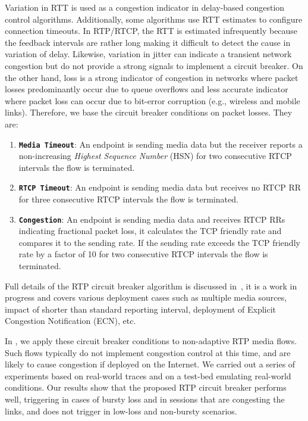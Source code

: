 Variation in RTT is used as a congestion indicator in delay-based congestion
control algorithms. Additionally, some algorithms use RTT estimates to
configure connection timeouts. In RTP/RTCP, the RTT is estimated infrequently
because the feedback intervals are rather long making it difficult to detect
the cause in variation of delay. Likewise, variation in jitter can indicate a
transient network congestion but do not provide a strong signals to implement
a circuit breaker. On the other hand, loss is a strong indicator of congestion
in networks where packet losses predominantly occur due to queue overflows and
less accurate indicator where packet loss can occur due to bit-error
corruption (e.g., wireless and mobile links). Therefore, we base the circuit
breaker conditions on packet losses. They are:

\begin{enumerate}
\setlength{\itemsep}{0pt}

\item \textbf{\texttt{Media Timeout}}: An endpoint is sending media data but
the receiver reports a non-increasing \emph{Highest Sequence Number} (HSN) for
two consecutive RTCP intervals the flow is terminated.

\item \textbf{\texttt{RTCP Timeout}}: An endpoint is sending media data but
receives no RTCP RR for three consecutive RTCP intervals the flow is
terminated.

\item \textbf{\texttt{Congestion}}: An endpoint is sending media data and
receives RTCP RRs indicating fractional packet loss, it calculates the TCP
friendly rate and compares it to the sending rate. If the sending rate exceeds
the TCP friendly rate  by a factor of 10 for two consecutive RTCP intervals
the flow is terminated.

\end{enumerate}

Full details of the RTP circuit breaker algorithm is discussed
in~\cite{draft.rtp.cb}, it is a work in progress and covers various deployment
cases such as multiple media sources, impact of shorter than standard
reporting interval, deployment of Explicit Congestion Notification (ECN), etc.

In , we apply these circuit breaker conditions to non-adaptive
RTP media flows. Such flows typically do not implement congestion control at
this time, and are likely to cause congestion if deployed on the Internet. We
carried out a series of experiments based on real-world traces and on a
test-bed emulating real-world conditions. Our results show that the proposed
RTP circuit breaker performs well, triggering in cases of bursty loss and in
sessions that are congesting the links, and does not trigger in low-loss and
non-bursty scenarios. 

